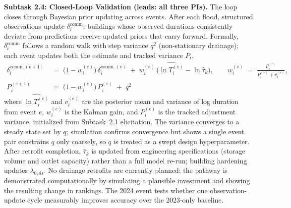 \documentclass[11pt]{article}
\begin{document}
\textbf{Subtask 2.4: Closed-Loop Validation
(leads: all three PIs).}
The loop closes through Bayesian prior updating across events.
After each flood, structured observations update $\delta_i^{\mathrm{comm}}$;
buildings whose observed durations consistently deviate from predictions receive
updated priors that carry forward.
Formally, $\delta_i^{\mathrm{comm}}$ follows a random walk with step variance
$q^2$ (non-stationary drainage); each event updates both the estimate and tracked
variance $P_i$,
\begin{equation}\label{eq:deltaupdate}
\begin{aligned}
  \delta_i^{\mathrm{comm},(e+1)} &\;=\;
  \bigl(1 - w_i^{(e)}\bigr)\,\delta_i^{\mathrm{comm},(e)}
  \;+\; w_i^{(e)}\,\bigl(\widehat{\ln T_i^{(e)}} - \ln \hat{\tau}_k\bigr),
  \qquad
  w_i^{(e)} \;=\; \frac{P_i^{(e)}}{P_i^{(e)} + v_i^{(e)}},\\[2pt]
  P_i^{(e+1)} &\;=\; \bigl(1 - w_i^{(e)}\bigr)\,P_i^{(e)} \;+\; q^2
\end{aligned}
\end{equation}
where $\widehat{\ln T_i^{(e)}}$ and $v_i^{(e)}$ are the posterior mean and
variance of log duration from event $e$, $w_i^{(e)}$ is the Kalman gain, and
$P_i^{(e)}$ is the tracked adjustment variance, initialized from Subtask~2.1
elicitation. The variance converges to a steady state set by $q$; simulation
confirms convergence but shows a single event pair constrains $q$ only coarsely,
so $q$ is treated as a swept design hyperparameter.
After retrofit completion, $\hat{\tau}_k$ is updated from engineering
specifications (storage volume and outlet capacity) rather than a full model
re-run; building hardening updates $\lambda_{0,ds}$. No drainage retrofits are
currently planned; the pathway is demonstrated computationally by simulating a
plausible investment and showing the resulting change in rankings.
The 2024 event tests whether one observation-update cycle measurably improves
accuracy over the 2023-only baseline.
\end{document}
